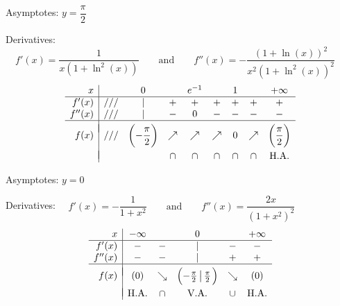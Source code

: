 \begin{Answer}
    
    	\Question Asymptotes: \quad $y=\dfrac{\pi}{2}$\par
    		Derivatives: $\quad f'(x)=\dfrac{1}{x(1+\ln^2(x))}\qquad\mbox{and}\qquad f''(x)=-\dfrac{(1+\ln (x))^2}{x^2(1+\ln^2(x))^2}$
    		\[ \begin{array}{r|cccccccc}
    		x &  & 0 &  & e^{-1} &  & 1 & &+\infty \\
    		\hline
    		f'(x)   & /// & | & + & + & + & + & + & + \\
    		f''(x)  & /// & | & - & 0 & - & - & - & - \\
    		\hline
    		&&&&&&&&\vspace{-0.3cm}\\
    		f(x)    & /// & \left(-\dfrac{\pi}{2}\right) & \nearrow & \nearrow & \nearrow & 0 & \nearrow & \left(\dfrac{\pi}{2}\right)\\
    		&&&&&&&&\vspace{-0.3cm}\\                                                                              
    		& &  & \cap & \cap & \cap & \cap & \cap & \mbox{H.A.} \\
    		\end{array}\]
    		
    
    	\Question Asymptotes: \quad $y=0$\par
    		Derivatives: $\quad f'(x)=-\dfrac{1}{1+x^{2}}\qquad\mbox{and}\qquad f''(x)=\dfrac{2x}{\left(1+x^{2}\right)^2}$
    		\[ \begin{array}{r|ccccc}
    		x &  -\infty &  & 0 & &+\infty \\
    		\hline
    		f'(x)   &  - & - & | & - & - \\
    		f''(x)  &  - & - & | & + & + \\
    		\hline
    		&&&&&\vspace{-0.3cm}\\
    		f(x)    &  (0) & \searrow & \left(-\frac{\pi}{2}\left|\,\frac{\pi}{2} \right.\right) & \searrow & (0)\\
    		&&&&&\vspace{-0.3cm}\\                                                                              
    		& \mbox{H.A.} & \cap & \mbox{V.A.} & \cup & \mbox{H.A.} \\
    		\end{array}\]
    		

\end{Answer}
